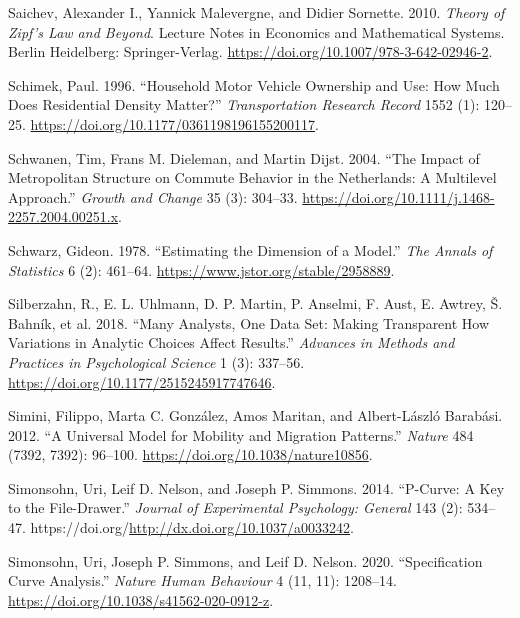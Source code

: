 \documentclass[
  11pt,
  openany]{memoir}
\newlength{\cslhangindent}
\newlength{\cslentryspacingunit} %
\newenvironment{CSLReferences}[2] %
 {%
  \setlength{\parindent}{0pt}
  \ifodd #1
  \let\oldpar\par
  \def\par{\hangindent=\cslhangindent\oldpar}
  \fi
  \setlength{\parskip}{#2\cslentryspacingunit}
 }%
 {}
\begin{document}
\begin{CSLReferences}{1}{0}
\leavevmode{}%
Saichev, Alexander I., Yannick Malevergne, and Didier Sornette. 2010. \emph{Theory of {Zipf}'s {Law} and {Beyond}}. Lecture {Notes} in {Economics} and {Mathematical Systems}. {Berlin Heidelberg}: {Springer-Verlag}. \url{https://doi.org/10.1007/978-3-642-02946-2}.

\leavevmode{}%
Schimek, Paul. 1996. {``Household {Motor Vehicle Ownership} and {Use}: How {Much Does Residential Density Matter}?''} \emph{Transportation Research Record} 1552 (1): 120--25. \url{https://doi.org/10.1177/0361198196155200117}.

\leavevmode{}%
Schwanen, Tim, Frans M. Dieleman, and Martin Dijst. 2004. {``The {Impact} of {Metropolitan Structure} on {Commute Behavior} in the {Netherlands}: A {Multilevel Approach}.''} \emph{Growth and Change} 35 (3): 304--33. \url{https://doi.org/10.1111/j.1468-2257.2004.00251.x}.

\leavevmode{}%
Schwarz, Gideon. 1978. {``Estimating the {Dimension} of a {Model}.''} \emph{The Annals of Statistics} 6 (2): 461--64. \url{https://www.jstor.org/stable/2958889}.

\leavevmode{}%
Silberzahn, R., E. L. Uhlmann, D. P. Martin, P. Anselmi, F. Aust, E. Awtrey, Š. Bahník, et al. 2018. {``Many {Analysts}, {One Data Set}: Making {Transparent How Variations} in {Analytic Choices Affect Results}.''} \emph{Advances in Methods and Practices in Psychological Science} 1 (3): 337--56. \url{https://doi.org/10.1177/2515245917747646}.

\leavevmode{}%
Simini, Filippo, Marta C. González, Amos Maritan, and Albert-László Barabási. 2012. {``A Universal Model for Mobility and Migration Patterns.''} \emph{Nature} 484 (7392, 7392): 96--100. \url{https://doi.org/10.1038/nature10856}.

\leavevmode{}%
Simonsohn, Uri, Leif D. Nelson, and Joseph P. Simmons. 2014. {``P-Curve: A Key to the File-Drawer.''} \emph{Journal of Experimental Psychology: General} 143 (2): 534--47. https://doi.org/\url{http://dx.doi.org/10.1037/a0033242}.

\leavevmode{}%
Simonsohn, Uri, Joseph P. Simmons, and Leif D. Nelson. 2020. {``Specification Curve Analysis.''} \emph{Nature Human Behaviour} 4 (11, 11): 1208--14. \url{https://doi.org/10.1038/s41562-020-0912-z}.


\end{CSLReferences}
\end{document}
